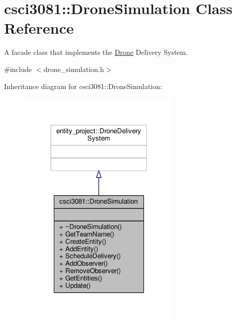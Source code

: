 \hypertarget{classcsci3081_1_1DroneSimulation}{}\section{csci3081\+:\+:Drone\+Simulation Class Reference}
\label{classcsci3081_1_1DroneSimulation}


A facade class that implements the \hyperlink{classcsci3081_1_1Drone}{Drone} Delivery System.  




{\ttfamily \#include $<$drone\+\_\+simulation.\+h$>$}



Inheritance diagram for csci3081\+:\+:Drone\+Simulation\+:\nopagebreak
\begin{figure}[H]
\begin{center}
\leavevmode
\includegraphics[width=223pt]{classcsci3081_1_1DroneSimulation__inherit__graph}
\end{center}
\end{figure}


